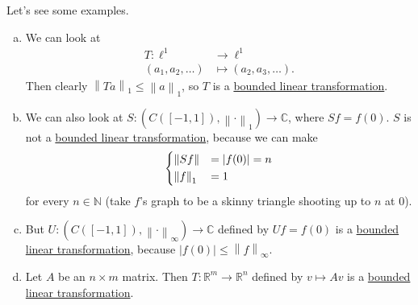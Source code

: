\begin{eg}
	Let's see some examples.
	\begin{enumerate}[(a)]
		\item We can look at
		      \[
			      \begin{split}
				      T \colon \ell^1 & \to \ell^1               \\
				      (a_1,a_2,\dots) & \mapsto (a_2,a_3,\dots).
			      \end{split}
		      \]
		      Then clearly \(\left\lVert Ta\right\rVert_1 \leq \left\lVert a\right\rVert _1\), so \(T\) is a \hyperref[def:bounded-linear-transformation]{bounded linear transformation}.
		\item We can also look at \(S \colon (C([-1,1]),\left\lVert \cdot\right\rVert _1) \to \mathbb{C}\), where \(Sf = f(0)\). \(S\) is not a \hyperref[def:bounded-linear-transformation]{bounded linear transformation},
		      because we can make
		      \[
			      \begin{dcases}
				      \left\lVert Sf\right\rVert  & = \left\vert f(0) \right\vert  = n \\
				      \left\lVert f\right\rVert_1 & = 1
			      \end{dcases}
		      \]
		      for every \(n \in \mathbb{N}\) (take \(f\)'s graph to be a skinny triangle shooting up to \(n\) at \(0\)).
		\item But \(U \colon (C([-1,1]), \left\lVert \cdot\right\rVert _\infty) \to \mathbb{C}\) defined by \(Uf = f(0)\) is a \hyperref[def:bounded-linear-transformation]{bounded linear transformation},
		      because \(\left\vert f(0) \right\vert \leq \left\lVert f\right\rVert_\infty\).
		\item Let \(A\) be an \(n \times m\) matrix. Then \(T \colon \mathbb{R}^m \to \mathbb{R}^n\) defined by \(v \mapsto Av\) is a
		      \hyperref[def:bounded-linear-transformation]{bounded linear transformation}.


\end{enumerate}
\end{eg}
